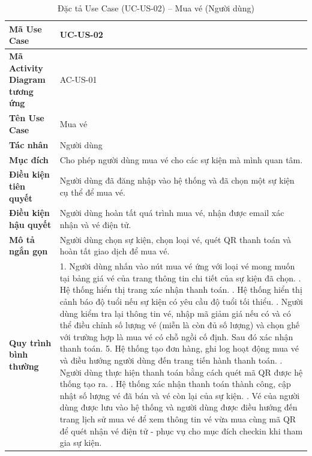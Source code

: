 \renewcommand{\arraystretch}{1.5}
\setlength{\tabcolsep}{4pt}
\begin{longtable}{|p{}|p{}|}
\caption{Đặc tả Use Case (UC-US-02) -- Mua vé (Người dùng) }\label{tab:uc_buy_ticket_user}\\
\hline
\textbf{Mã Use Case} & UC-US-02 \\ \hline
\textbf{Mã Activity Diagram tương ứng} & AC-US-01 \\ \hline
\textbf{Tên Use Case} & Mua vé \\ \hline
\textbf{Tác nhân} & Người dùng \\ \hline
\textbf{Mục đích} & Cho phép người dùng mua vé cho các sự kiện mà mình quan tâm. \\ \hline
\textbf{Điều kiện tiên quyết} & Người dùng đã đăng nhập vào hệ thống và đã chọn một sự kiện cụ thể để mua vé. \\ \hline
\textbf{Điều kiện hậu quyết} & Người dùng hoàn tất quá trình mua vé, nhận được email xác nhận và vé điện tử. \\ \hline
\textbf{Mô tả ngắn gọn} & Người dùng chọn sự kiện, chọn loại vé, quét QR thanh toán và hoàn tất giao dịch để mua vé. \\ \hline
\textbf{Quy trình bình thường} &
1. Người dùng nhấn vào nút mua vé ứng với loại vé mong muốn tại bảng giá vé của trang thông tin chi tiết của sự kiện đã chọn. \newline
2. Hệ thống hiển thị trang xác nhận thanh toán. \newline
3. Hệ thống hiển thị cảnh báo độ tuổi nếu sự kiện có yêu cầu độ tuổi tối thiểu. \newline
4. Người dùng kiểm tra lại thông tin vé, nhập mã giảm giá nếu có và có thể điều chỉnh số lượng vé (miễn là còn đủ số lượng) và chọn ghế với trường hợp là mua vé có chỗ ngồi cố định. Sau đó xác nhận thanh toán.
5. Hệ thống tạo đơn hàng, ghi log hoạt động mua vé và điều hướng người dùng đến trang tiến hành thanh toán. \newline
6. Người dùng thực hiện thanh toán bằng cách quét mã QR được hệ thống tạo ra. \newline
7. Hệ thống xác nhận thanh toán thành công, cập nhật số lượng vé đã bán và vé còn lại của sự kiện. \newline
8. Vé của người dùng được lưu vào hệ thống và người dùng được điều hướng đến trang lịch sử mua vé để xem thông tin vé vừa mua cùng mã QR để quét nhận vé điện tử - phục vụ cho mục đích checkin khi tham gia sự kiện. \newline

\end{longtable}
